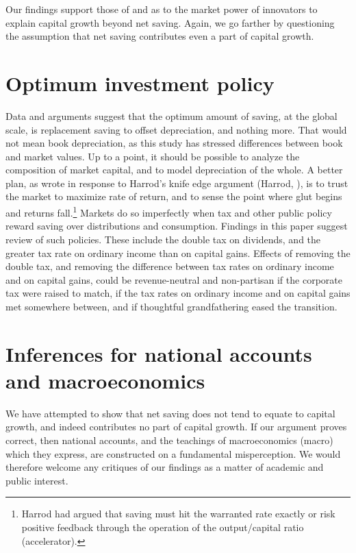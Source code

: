 \documentclass[a4paper,fleqn]{latex_styles/cas-sc}
\begin{document}
Our findings support those of \cite{picketyCapitalIsBack2014} and \cite{kurz2023market} as to the market power of innovators to explain capital growth beyond net saving. Again, we go farther by questioning the assumption that net saving contributes even a part of capital growth.

\hypertarget{optimum-investment-policy}{%
\section{Optimum investment policy}\label{optimum-investment-policy}}

Data and arguments suggest that the optimum amount of
saving, at the global scale, is replacement saving to offset depreciation, and nothing
more. That would not mean book depreciation, as this study has stressed
differences between book and market values. Up to a point, it should be
possible to analyze the composition of market capital, and to model
depreciation of the whole. A better plan, as
\citet{solowContributionTheoryEconomic1956a} wrote in response to
Harrod's knife edge argument (Harrod, \citeyear{harrodEssayDynamicTheory1939}), is to
trust the market to maximize rate of return, and to sense the point
where glut begins and returns fall.\footnote{Harrod had argued that
saving must hit the warranted rate exactly or risk positive
feedback through the operation of the output/capital ratio
(accelerator).}
%
Markets do so imperfectly when tax and other public policy reward
saving over distributions and consumption. Findings in this paper
suggest review of such policies. These include the double tax on
dividends, and the greater tax rate on ordinary income than on capital
gains. Effects of removing the double tax, and removing the difference
between tax rates on ordinary income and on capital gains, could be
revenue-neutral and non-partisan if the corporate tax were raised to
match, if the tax rates on ordinary income and on capital gains met
somewhere between, and if thoughtful grandfathering eased the
transition.

\section{Inferences for national accounts and macroeconomics}

We have attempted to show that net saving does not tend to equate to capital growth, and indeed contributes no part of capital growth. If our argument proves correct, then national accounts, and the teachings of macroeconomics (macro) which they express, are constructed on a fundamental misperception. We would therefore welcome any critiques of our findings as a matter of academic and public interest.
\end{document}
